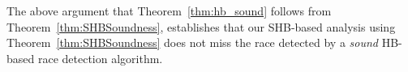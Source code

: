 The above argument that Theorem~\ref{thm:hb_sound} follows from
Theorem~\ref{thm:SHBSoundness}, establishes that our SHB-based
analysis using Theorem~\ref{thm:SHBSoundness} does not miss the race
detected by a \emph{sound} HB-based race detection algorithm.






